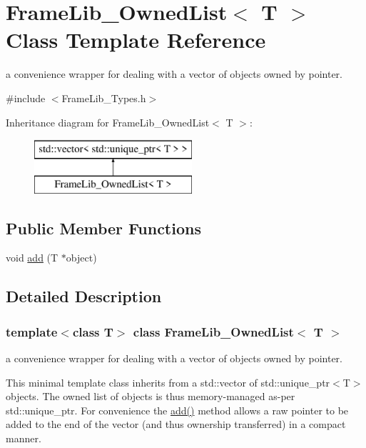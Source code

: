 \hypertarget{struct_frame_lib___owned_list}{}\section{Frame\+Lib\+\_\+\+Owned\+List$<$ T $>$ Class Template Reference}
\label{struct_frame_lib___owned_list}


a convenience wrapper for dealing with a vector of objects owned by pointer.  




{\ttfamily \#include $<$Frame\+Lib\+\_\+\+Types.\+h$>$}

Inheritance diagram for Frame\+Lib\+\_\+\+Owned\+List$<$ T $>$\+:\begin{figure}[H]
\begin{center}
\leavevmode
\includegraphics[height=2.000000cm]{struct_frame_lib___owned_list}
\end{center}
\end{figure}
\subsection*{Public Member Functions}
\begin{DoxyCompactItemize}
\item 
void \hyperlink{struct_frame_lib___owned_list_a9c7d0ad8bf68242a3889794039903d40}{add} (T $\ast$object)
\end{DoxyCompactItemize}


\subsection{Detailed Description}
\subsubsection*{template$<$class T$>$\newline
class Frame\+Lib\+\_\+\+Owned\+List$<$ T $>$}

a convenience wrapper for dealing with a vector of objects owned by pointer. 

This minimal template class inherits from a std\+::vector of std\+::unique\+\_\+ptr$<$\+T$>$ objects. The owned list of objects is thus memory-\/managed as-\/per std\+::unique\+\_\+ptr. For convenience the \hyperlink{struct_frame_lib___owned_list_a9c7d0ad8bf68242a3889794039903d40}{add()} method allows a raw pointer to be added to the end of the vector (and thus ownership transferred) in a compact manner. 

